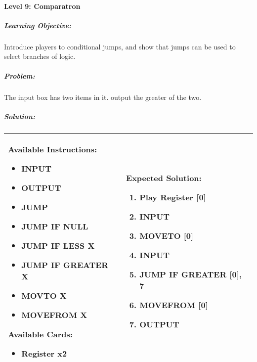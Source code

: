 \paragraph{Level 9: Comparatron}
\subparagraph{Learning Objective:} Introduce players to conditional jumps, and show that jumps can be used to select branches of logic.

\subparagraph{Problem:} The input box has two items in it. output the greater of the two.

\subparagraph{Solution:} 
\begin{center}
    \begin{tabular}{ | m{5cm} | m{9cm} | } 
        \hline
            \textbf{Available Instructions:} 
            \begin{itemize}
                \setlength\itemsep{-.35em}
                \item INPUT
                \item OUTPUT
                \item JUMP
                \item JUMP IF NULL
                \item JUMP IF LESS X
                \item JUMP IF GREATER X
                \item MOVTO X
                \item MOVEFROM X
            \end{itemize}
            \textbf{Available Cards:} 
            \begin{itemize}
                \setlength\itemsep{-.35em}
                \item Register x2
            \end{itemize}& 
            \textbf{Expected Solution:} 
            \begin{enumerate}
                \setlength\itemsep{-.35em}
                \item Play Register [0]
                \item INPUT
                \item MOVETO [0]
                \item INPUT
                \item JUMP IF GREATER [0], 7
                \item MOVEFROM [0]
                \item OUTPUT
            \end{enumerate}
            \\
        \hline
    \end{tabular}
\end{center}

